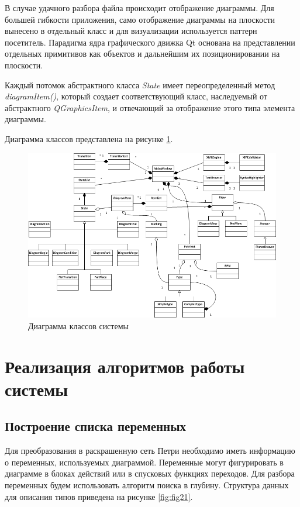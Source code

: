 В случае удачного разбора файла происходит отображение диаграммы. Для большей гибкости приложения, само отображение диаграммы на плоскости вынесено в отдельный класс и для визуализации используется паттерн посетитель. Парадигма ядра графического движка Qt основана на представлении отдельных примитивов как объектов и дальнейшим их позиционировании на плоскости.

Каждый потомок абстрактного класса \textit{State} имеет переопределенный метод \textit{diagramItem()}, который создает соответствующий класс, наследуемый от абстрактного \textit{QGraphicsItem}, и отвечающий за отображение этого типа элемента диаграммы.

Диаграмма классов представлена на рисунке \ref{fig:fig20}.

\begin{figure}
	\begin{center}
		\includegraphics[width=\textwidth]{include/ClassDiagram.png}
	\end{center}
	\caption{Диаграмма классов системы}
	\label{fig:fig20}
\end{figure}

\section{Реализация алгоритмов работы системы}

\subsection{Построение списка переменных}

Для преобразования в раскрашенную сеть Петри необходимо иметь информацию о переменных, используемых диаграммой. Переменные могут фигурировать в диаграмме в блоках действий или в спусковых функциях переходов. Для разбора переменных будем использовать алгоритм поиска в глубину. Структура данных для описания типов приведена на рисунке \ref{fig:fig21}.

